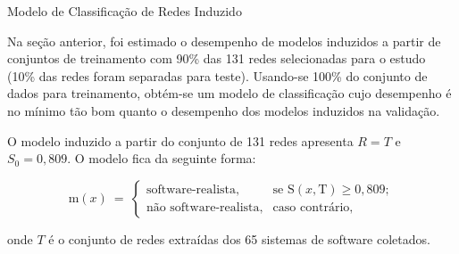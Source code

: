 \begin{section}{Modelo de Classificação de Redes Induzido} \label{cap:clas4}
	
	Na seção anterior, foi estimado o desempenho de modelos induzidos a partir de conjuntos de treinamento com 90\% das 131 redes selecionadas para o estudo (10\% das redes foram separadas para teste). Usando-se 100\% do conjunto de dados para treinamento, obtém-se um modelo de classificação cujo desempenho é no mínimo tão bom quanto o desempenho dos modelos induzidos na validação.
	
	O modelo induzido a partir do conjunto de 131 redes apresenta $R = T$ e $S_0 = 0,809$. O modelo fica da seguinte forma:
	
	$$
	\mathrm{m}(x) ~=~
	\left\{
	\begin{array}{cl}
	\mbox{software-realista,} & \mbox{se } \mathrm{S}(x, \mbox{T}) \ge 0,809; \\
	\mbox{não software-realista,} & \mbox{caso contrário,}
	\end{array}
	\right.
	$$

	onde $T$ é o conjunto de redes extraídas dos 65 sistemas de software coletados.
		
	
	
\end{section}

